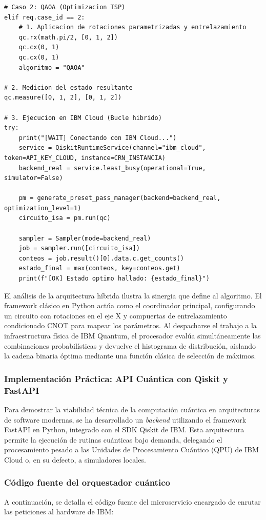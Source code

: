 \documentclass[12pt,a4paper]{article}
\begin{document}
\begin{lstlisting}[caption={Preparación del Ansatz QAOA y orquestación híbrida}]
# Caso 2: QAOA (Optimizacion TSP)
elif req.case_id == 2:
    # 1. Aplicacion de rotaciones parametrizadas y entrelazamiento
    qc.rx(math.pi/2, [0, 1, 2])
    qc.cx(0, 1)
    qc.cx(0, 1)
    algoritmo = "QAOA"

# 2. Medicion del estado resultante
qc.measure([0, 1, 2], [0, 1, 2])

# 3. Ejecucion en IBM Cloud (Bucle hibrido)
try:
    print("[WAIT] Conectando con IBM Cloud...")
    service = QiskitRuntimeService(channel="ibm_cloud", token=API_KEY_CLOUD, instance=CRN_INSTANCIA)
    backend_real = service.least_busy(operational=True, simulator=False)
    
    pm = generate_preset_pass_manager(backend=backend_real, optimization_level=1)
    circuito_isa = pm.run(qc)
    
    sampler = Sampler(mode=backend_real)
    job = sampler.run([circuito_isa])
    conteos = job.result()[0].data.c.get_counts()
    estado_final = max(conteos, key=conteos.get)
    print(f"[OK] Estado optimo hallado: {estado_final}")
\end{lstlisting}

El análisis de la arquitectura híbrida ilustra la sinergia que define al algoritmo. El framework clásico en Python actúa como el coordinador principal, configurando un circuito con rotaciones en el eje X y compuertas de entrelazamiento condicionado CNOT para mapear los parámetros. Al despacharse el trabajo a la infraestructura física de IBM Quantum, el procesador evalúa simultáneamente las combinaciones probabilísticas y devuelve el histograma de distribución, aislando la cadena binaria óptima mediante una función clásica de selección de máximos.

\subsubsection{Implementación Práctica: API Cuántica con Qiskit y FastAPI}
Para demostrar la viabilidad técnica de la computación cuántica en arquitecturas de software modernas, se ha desarrollado un \textit{backend} utilizando el framework FastAPI en Python, integrado con el SDK Qiskit de IBM. Esta arquitectura permite la ejecución de rutinas cuánticas bajo demanda, delegando el procesamiento pesado a las Unidades de Procesamiento Cuántico (QPU) de IBM Cloud o, en su defecto, a simuladores locales.

\subsubsection{Código fuente del orquestador cuántico}
A continuación, se detalla el código fuente del microservicio encargado de enrutar las peticiones al hardware de IBM:
\end{document}
